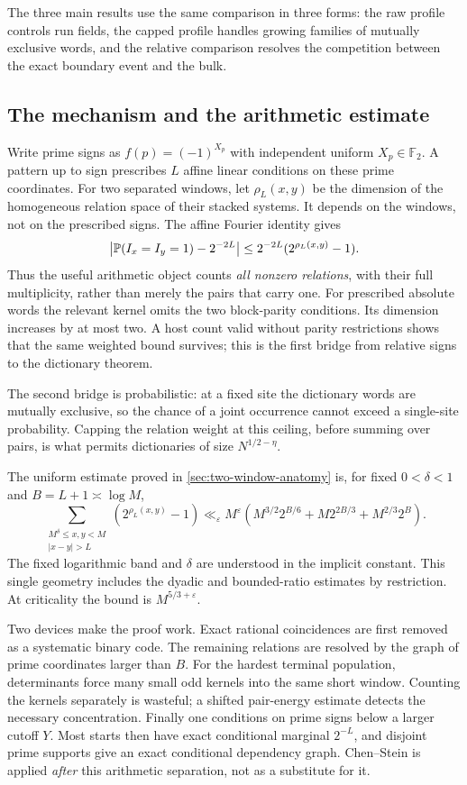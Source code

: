 The three main results use the same comparison in three forms: the raw
profile controls run fields, the capped profile handles growing families
of mutually exclusive words, and the relative comparison resolves the
competition between the exact boundary event and the bulk.

\subsection{The mechanism and the arithmetic estimate}
Write prime signs as $f(p)=(-1)^{X_p}$ with independent uniform
$X_p\in\mathbb F_2$. A pattern up to sign prescribes $L$ affine linear
conditions on these prime coordinates. For two separated windows, let
$\rho_L(x,y)$ be the dimension of the homogeneous relation space of their
stacked systems. It depends on the windows, not on the prescribed signs.
The affine Fourier identity gives
\[
 \left|\mathbb P(I_x=I_y=1)-2^{-2L}\right|
 \le 2^{-2L}(2^{\rho_L(x,y)}-1).
\]
Thus the useful arithmetic object counts \emph{all nonzero relations},
with their full multiplicity, rather than merely the pairs that carry one.
For prescribed absolute words the relevant kernel omits the two block-parity
conditions. Its dimension increases by at most two. A host count valid
without parity restrictions shows that the same weighted bound survives;
this is the first bridge from relative signs to the dictionary theorem.

The second bridge is probabilistic: at a fixed site the dictionary words are
mutually exclusive, so the chance of a joint occurrence cannot exceed a
single-site probability. Capping the relation weight at this ceiling,
before summing over pairs, is what permits dictionaries of size
$N^{1/2-\eta}$.

The uniform estimate proved in \cref{sec:two-window-anatomy} is, for fixed
$0<\delta<1$ and $B=L+1\asymp\log M$,
\begin{equation}\label{eq:intro-master-profile}
 \sum_{\substack{M^\delta\le x,y<M\\|x-y|>L}}
 (2^{\rho_L(x,y)}-1)
 \ll_\varepsilon M^\varepsilon
 \left(M^{3/2}2^{B/6}+M2^{2B/3}+M^{2/3}2^B\right).
\end{equation}
The fixed logarithmic band and $\delta$ are understood in the implicit
constant. This single geometry includes the dyadic and bounded-ratio
estimates by restriction. At criticality the bound is $M^{5/3+\varepsilon}$.

Two devices make the proof work. Exact rational coincidences are first
removed as a systematic binary code. The remaining relations are resolved
by the graph of prime coordinates larger than $B$. For the hardest terminal
population, determinants force many small odd kernels into the same short
window. Counting the kernels separately is wasteful; a shifted pair-energy
estimate detects the necessary concentration. Finally one conditions on
prime signs below a larger cutoff $Y$. Most starts then have exact
conditional marginal $2^{-L}$, and disjoint prime supports give an exact
conditional dependency graph. Chen--Stein is applied \emph{after} this
arithmetic separation, not as a substitute for it.

